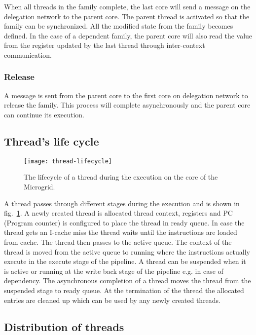 \documentclass{article}
\begin{document}
When all threads in the family complete, the last core will send a message on
the delegation network to the parent core. The parent thread is activated so
that the family can be synchronized. All the modified state from the family
becomes defined. In the case of a dependent family, the parent core will also
read the value from the register updated by the last thread through
inter-context communication.

\subsubsection*{Release}

A message is sent from the parent core to the first core on delegation network
to release the family. This process will complete asynchronously and the parent
core can continue its execution.

\subsection{Thread's life cycle}\label{sn:thread_lifecycle}

\begin{figure}
\begin{centering}
\label{Neighborhood}
    \texttt{[image: thread-lifecycle]}
    \caption{\label{fig:thread_lifecycle}The lifecycle of a thread during the execution on the core of the
    Microgrid.}
\end{centering}
\end{figure}

A thread passes through different stages during the execution and is shown
in fig.~\ref{fig:thread_lifecycle}. A newly created thread is allocated thread
context, registers and PC (Program counter) is configured to place the thread
in ready queue. In case the thread gets an I-cache miss the thread waits
until the instructions are loaded from cache. The thread then passes to the
active queue. The context of the thread is moved from the active queue to
running where the instructions actually execute in the execute stage of the
pipeline. A thread can be suspended when it is active or running at the write
back stage of the pipeline e.g. in case of dependency. The asynchronous
completion of a thread moves the thread from the suspended stage to ready
queue. At the termination of the thread the allocated entries are cleaned up
which can be used by any newly created threads.

\subsection{Distribution of threads}
\end{document}
